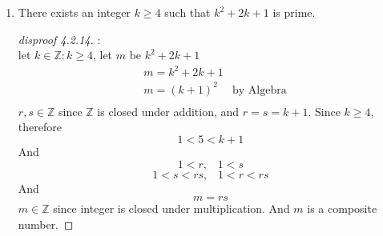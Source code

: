 \documentclass[12pt]{article}
\newcommand{\Z}{\mathbb{Z}}
\begin{document}
\begin{enumerate}
\begin{enumerate}
\begin{proof}[proof 4.2.8]
                            \begin{align*}
                                &  k = n^2 - 1  & \text{Substitution}\\
                                &  k = (n-1)(n+1) & \text{Algebra}\\
                            \end{align*}
                            Where $n-1 \in \Z$ and $n+1 \in \Z$
                            Since $m\geq 4$, therefore $n > 2 \vee n < -2$.  Assume $n>2$, then
                            \begin{align*}
                                &   1 < n-1 < n < n+1 < (n-1)(n+1)\\
                                &   n-1,n+1 \in \Z^+ \\
                                &   k = (n-1)(n+1)
                            \end{align*}
                            Therefore, $k \notin \mathbb{P}$ for all perfect square $m$.
                        
                    \end{proof}


                \item[14.] There exists an integer $k\geq 4$ such that $k^2 + 2k + 1$ is prime. 
                    \begin{proof}[disproof 4.2.14]:\\
                        let $k \in \Z : k \geq 4$, let $m$ be $k^2 + 2k + 1$
                        \begin{align*}
                            &m=k^2 + 2k + 1\\
                            &m=(k+1)^2 & \text{by Algebra}\\
                        \end{align*}
                        $r,s \in \Z$ since $\Z$ is closed under addition, and $r=s=k+1$. Since $k\geq 4$, therefore
                        \[
                        1<5<k+1
                        \]
                        And
                        \[
                        1<r,\;\;\; 1<s
                        \]\[
                        1<s < rs,\;\;\; 1<r<rs
                        \]
                        And
                        \[
                        m=rs
                        \]
                        $m\in \Z$ since integer is closed under multiplication. And $m$ is a composite number.
                        

\end{proof}
\end{enumerate}
\end{enumerate}
\end{document}
